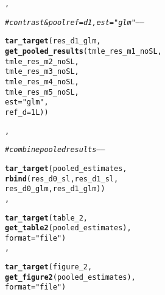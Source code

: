 \documentclass{article}\usepackage[]{graphicx}\usepackage[]{color}
\makeatletter
\newcommand{\hlnum}[1]{\textcolor[rgb]{0.686,0.059,0.569}{#1}}%
\newcommand{\hlstr}[1]{\textcolor[rgb]{0.192,0.494,0.8}{#1}}%
\newcommand{\hlcom}[1]{\textcolor[rgb]{0.678,0.584,0.686}{\textit{#1}}}%
\newcommand{\hlstd}[1]{\textcolor[rgb]{0.345,0.345,0.345}{#1}}%
\newcommand{\hlkwc}[1]{\textcolor[rgb]{0.333,0.667,0.333}{#1}}%
\newcommand{\hlkwd}[1]{\textcolor[rgb]{0.737,0.353,0.396}{\textbf{#1}}}%
\newenvironment{kframe}{%
 \def\at@end@of@kframe{}%
 \ifinner\ifhmode%
  \def\at@end@of@kframe{\end{minipage}}%
  \begin{minipage}{\columnwidth}%
 \fi\fi%
 \def\FrameCommand##1{\hskip\@totalleftmargin \hskip-\fboxsep
 \colorbox{shadecolor}{##1}\hskip-\fboxsep
     \hskip-\linewidth \hskip-\@totalleftmargin \hskip\columnwidth}%
 \MakeFramed {\advance\hsize-\width
   \@totalleftmargin\z@ \linewidth\hsize
   \@setminipage}}%
 {\par\unskip\endMakeFramed%
 \at@end@of@kframe}
\newenvironment{knitrout}{}{} %
\makeatother
\begin{document}
\begin{knitrout}
\begin{kframe}
\begin{alltt}
  \hlstd{,}

  \hlcom{# contrast & pool ref=d1, est= "glm" -----}

  \hlkwd{tar_target}\hlstd{(res_d1_glm,}
             \hlkwd{get_pooled_results}\hlstd{(tmle_res_m1_noSL,}
                                \hlstd{tmle_res_m2_noSL,}
                                \hlstd{tmle_res_m3_noSL,}
                                \hlstd{tmle_res_m4_noSL,}
                                \hlstd{tmle_res_m5_noSL,}
                                \hlkwc{est}\hlstd{=} \hlstr{"glm"}\hlstd{,}
                                \hlkwc{ref_d} \hlstd{=} \hlnum{1L}\hlstd{))}

  \hlstd{,}


  \hlcom{# combine pooled results -----}

  \hlkwd{tar_target}\hlstd{(pooled_estimates,}
             \hlkwd{rbind}\hlstd{(res_d0_sl,res_d1_sl,}
                   \hlstd{res_d0_glm,res_d1_glm))}
  \hlstd{,}


  \hlkwd{tar_target}\hlstd{(table_2,}
             \hlkwd{get_table2}\hlstd{(pooled_estimates),}
             \hlkwc{format}\hlstd{=} \hlstr{"file"}\hlstd{)}
  \hlstd{,}

  \hlkwd{tar_target}\hlstd{(figure_2,}
             \hlkwd{get_figure2}\hlstd{(pooled_estimates),}
             \hlkwc{format} \hlstd{=} \hlstr{"file"}\hlstd{)}




\end{alltt}
\end{kframe}
\end{knitrout}
\end{document}
